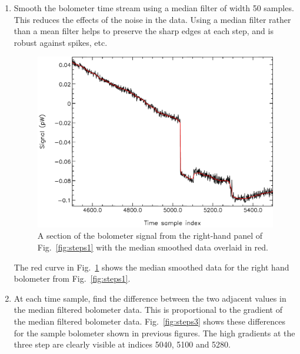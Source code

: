 \documentclass[useAMS,usenatbib,nofootinbib]{mn2e}
\begin{document}
\begin{enumerate}

\item Smooth the bolometer time stream using a median filter of width
50 samples. This reduces the effects of the noise in the data. Using a
median filter rather than a mean filter helps to preserve the sharp edges
at each step, and is robust against spikes, etc.

\begin{figure}
\centering
\includegraphics[width=\linewidth]{steps2.pdf}
\caption{A section of the bolometer signal from the right-hand panel
of Fig.~\ref{fig:steps1} with the median smoothed data overlaid in
red.}
\label{fig:steps2}
\end{figure}

The red curve in Fig.~\ref{fig:steps2} shows the median smoothed data for
the right hand bolometer from Fig.~\ref{fig:steps1}.

\item At each time sample, find the difference between the two adjacent
values in the median filtered bolometer data. This is proportional to the
gradient of the median filtered bolometer data. Fig.~\ref{fig:steps3}
shows these differences for the sample bolometer shown in previous
figures. The high gradients at the three step are clearly visible at
indices 5040, 5100 and 5280.


\end{enumerate}
\end{document}
